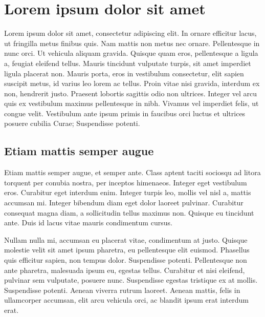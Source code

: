 \chapter{Lorem ipsum dolor sit amet}

Lorem ipsum dolor sit amet, consectetur adipiscing elit.
In ornare efficitur lacus, ut fringilla metus finibus quis.
Nam mattis non metus nec ornare.
Pellentesque in nunc orci.
Ut vehicula aliquam gravida.
Quisque quam eros, pellentesque a ligula a, feugiat eleifend tellus.
Mauris tincidunt vulputate turpis, sit amet imperdiet ligula placerat non.
Mauris porta, eros in vestibulum consectetur, elit sapien suscipit metus, id varius leo lorem ac tellus.
Proin vitae nisi gravida, interdum ex non, hendrerit justo.
Praesent lobortis sagittis odio non ultrices.
Integer vel arcu quis ex vestibulum maximus pellentesque in nibh.
Vivamus vel imperdiet felis, ut congue velit.
Vestibulum ante ipsum primis in faucibus orci luctus et ultrices posuere cubilia Curae; Suspendisse potenti.

\section{Etiam mattis semper augue}

Etiam mattis semper augue, et semper ante.
Class aptent taciti sociosqu ad litora torquent per conubia nostra, per inceptos himenaeos.
Integer eget vestibulum eros.
Curabitur eget interdum enim.
Integer turpis leo, mollis vel nisl a, mattis accumsan mi.
Integer bibendum diam eget dolor laoreet pulvinar.
Curabitur consequat magna diam, a sollicitudin tellus maximus non.
Quisque eu tincidunt ante.
Duis id lacus vitae mauris condimentum cursus.

Nullam nulla mi, accumsan eu placerat vitae, condimentum at justo.
Quisque molestie velit sit amet ipsum pharetra, eu pellentesque elit euismod.
Phasellus quis efficitur sapien, non tempus dolor.
Suspendisse potenti.
Pellentesque non ante pharetra, malesuada ipsum eu, egestas tellus.
Curabitur et nisi eleifend, pulvinar sem vulputate, posuere nunc.
Suspendisse egestas tristique ex at mollis.
Suspendisse potenti.
Aenean viverra rutrum laoreet.
Aenean mattis, felis in ullamcorper accumsan, elit arcu vehicula orci, ac blandit ipsum erat interdum erat.

